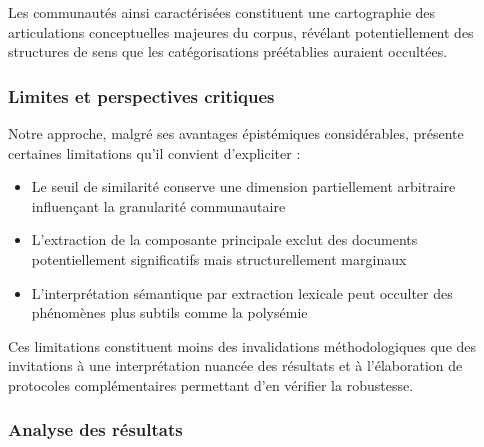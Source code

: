 \documentclass[12pt,a4paper,oneside,titlepage]{book} %
\begin{document}
Les communautés ainsi caractérisées constituent une cartographie des articulations conceptuelles majeures du corpus, révélant potentiellement des structures de sens que les catégorisations préétablies auraient occultées.

\subsubsection{Limites et perspectives critiques}

Notre approche, malgré ses avantages épistémiques considérables, présente certaines limitations qu'il convient d'expliciter :
\begin{itemize}
    \item Le seuil de similarité conserve une dimension partiellement arbitraire influençant la granularité communautaire
    \item L'extraction de la composante principale exclut des documents potentiellement significatifs mais structurellement marginaux
    \item L'interprétation sémantique par extraction lexicale peut occulter des phénomènes plus subtils comme la polysémie
\end{itemize}

Ces limitations constituent moins des invalidations méthodologiques que des invitations à une interprétation nuancée des résultats et à l'élaboration de protocoles complémentaires permettant d'en vérifier la robustesse.

\subsubsection{Analyse des résultats}
\end{document}
